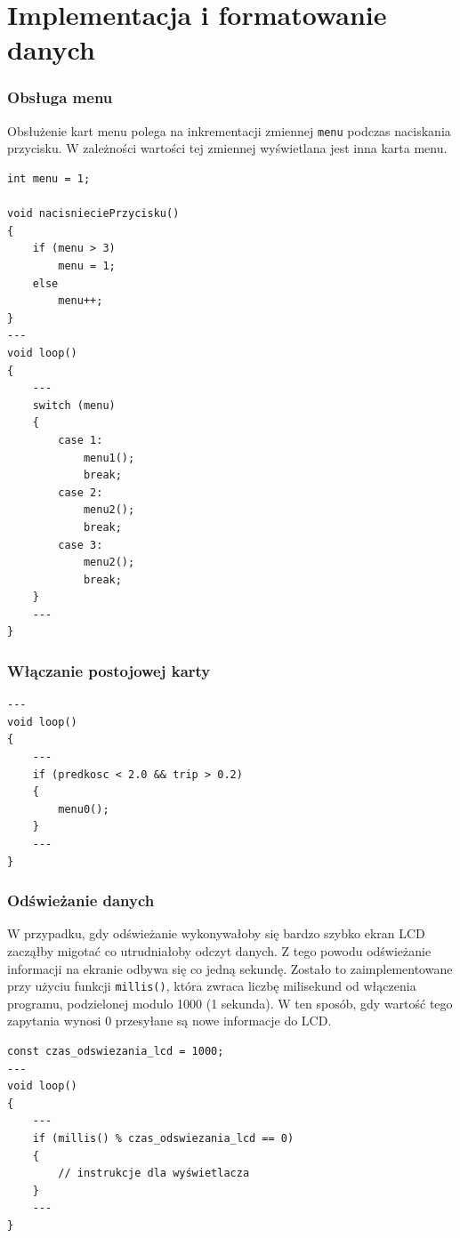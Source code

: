 \section{Implementacja i formatowanie danych}
\subsubsection{Obsługa menu}

Obsłużenie kart menu polega na inkrementacji zmiennej \texttt{menu} podczas naciskania przycisku. W zależności wartości tej zmiennej wyświetlana jest inna karta menu.

\begin{lstlisting}[label=list:menu,caption=Implementacja obsługi menu,
basicstyle=\footnotesize\ttfamily]
int menu = 1;

void nacisnieciePrzycisku()
{
    if (menu > 3)
        menu = 1;
    else
        menu++;
}
---
void loop()
{
    ---
    switch (menu) 
    {
        case 1:
            menu1();
            break;
        case 2:
            menu2();
            break;
        case 3:
            menu2();
            break;
    }
    ---
}
\end{lstlisting}

\subsubsection{Włączanie postojowej karty}

\begin{lstlisting}[label=list:menu_card4,caption=Włączanie karty podczas postoju,
basicstyle=\footnotesize\ttfamily]
---
void loop()
{
    ---
    if (predkosc < 2.0 && trip > 0.2)
    {
        menu0();
    }
    ---
}
\end{lstlisting}
\subsubsection{Odświeżanie danych}
\par W przypadku, gdy odświeżanie wykonywałoby się bardzo szybko ekran LCD zacząłby migotać co utrudniałoby odczyt danych. Z tego powodu odświeżanie informacji na ekranie odbywa się co jedną sekundę. Zostało to zaimplementowane przy użyciu funkcji \texttt{millis()}, która zwraca liczbę milisekund od włączenia programu, podzielonej modulo 1000 (1 sekunda). W ten sposób, gdy wartość tego zapytania wynosi 0 przesyłane są nowe informacje do LCD.

\begin{lstlisting}[label=list:refresh_rate,caption=Implementacja odświeżania ekranu,
basicstyle=\footnotesize\ttfamily]
const czas_odswiezania_lcd = 1000;
---
void loop()
{
    ---
    if (millis() % czas_odswiezania_lcd == 0) 
    {
        // instrukcje dla wyświetlacza
    }
    ---
}

\end{lstlisting}

